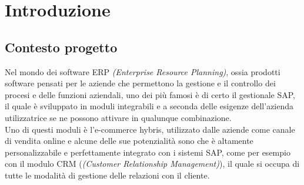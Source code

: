 
\chapter{Introduzione}
\section{Contesto progetto}
Nel mondo dei software ERP \textit{(Enterprise Resource Planning)}, ossia prodotti software pensati per le aziende che permettono la gestione e il controllo dei procesi e delle funzioni aziendali, uno dei più famosi è di certo il gestionale SAP, il quale è sviluppato in moduli integrabili e a seconda delle esigenze dell'azienda utilizzatrice se ne possono attivare in qualunque combinazione.\\
Uno di questi moduli è l'e-commerce hybris, utilizzato dalle aziende come canale di vendita online e alcune delle sue potenzialità sono che è altamente personalizzabile e perfettamente integrato con i sistemi SAP, come per esempio con il modulo CRM (\textit{(Customer Relationship Management)}), il quale si occupa di tutte le modalità di gestione delle relazioni con il cliente.


